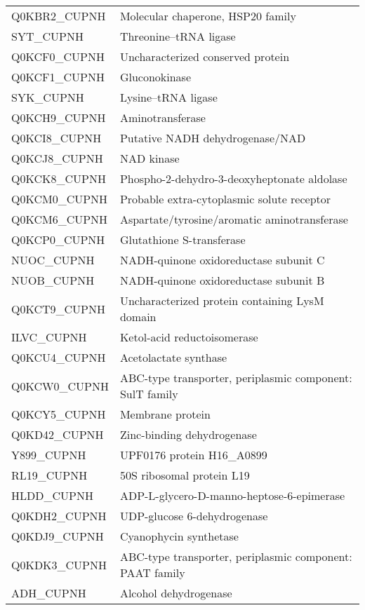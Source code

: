 \begin{center}
\begin{longtable}{ l l }
Q0KBR2\_CUPNH & Molecular chaperone, HSP20 family \\ [0.5ex]
SYT\_CUPNH & Threonine--tRNA ligase \\ [0.5ex]
Q0KCF0\_CUPNH & Uncharacterized conserved protein \\ [0.5ex]
Q0KCF1\_CUPNH & Gluconokinase \\ [0.5ex]
SYK\_CUPNH & Lysine--tRNA ligase \\ [0.5ex]
Q0KCH9\_CUPNH & Aminotransferase \\ [0.5ex]
Q0KCI8\_CUPNH & Putative NADH dehydrogenase/NAD \\ [0.5ex]
Q0KCJ8\_CUPNH & NAD kinase \\ [0.5ex]
Q0KCK8\_CUPNH & Phospho-2-dehydro-3-deoxyheptonate aldolase \\ [0.5ex]
Q0KCM0\_CUPNH & Probable extra-cytoplasmic solute receptor \\ [0.5ex]
Q0KCM6\_CUPNH & Aspartate/tyrosine/aromatic aminotransferase \\ [0.5ex]
Q0KCP0\_CUPNH & Glutathione S-transferase \\ [0.5ex]
NUOC\_CUPNH & NADH-quinone oxidoreductase subunit C \\ [0.5ex]
NUOB\_CUPNH & NADH-quinone oxidoreductase subunit B \\ [0.5ex]
Q0KCT9\_CUPNH & Uncharacterized protein containing LysM domain \\ [0.5ex]
ILVC\_CUPNH & Ketol-acid reductoisomerase \\ [0.5ex]
Q0KCU4\_CUPNH & Acetolactate synthase \\ [0.5ex]
Q0KCW0\_CUPNH & ABC-type transporter, periplasmic component: SulT family \\ [0.5ex]
Q0KCY5\_CUPNH & Membrane protein \\ [0.5ex]
Q0KD42\_CUPNH & Zinc-binding dehydrogenase \\ [0.5ex]
Y899\_CUPNH & UPF0176 protein H16\_A0899 \\ [0.5ex]
RL19\_CUPNH & 50S ribosomal protein L19 \\ [0.5ex]
HLDD\_CUPNH & ADP-L-glycero-D-manno-heptose-6-epimerase \\ [0.5ex]
Q0KDH2\_CUPNH & UDP-glucose 6-dehydrogenase \\ [0.5ex]
Q0KDJ9\_CUPNH & Cyanophycin synthetase \\ [0.5ex]
Q0KDK3\_CUPNH & ABC-type transporter, periplasmic component: PAAT family \\ [0.5ex]
ADH\_CUPNH & Alcohol dehydrogenase \\ [0.5ex]

\end{longtable}
\end{center}

